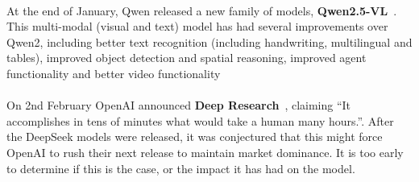 \paragraph{}At the end of January, Qwen released a new family of models, \textbf{Qwen2.5-VL}~\cite{Qwen2025}. This multi-modal (visual and text) model has had several improvements over Qwen2, including better text recognition (including handwriting, multilingual and tables), improved object detection and spatial reasoning, improved agent functionality and better video functionality

\paragraph{}On 2nd February OpenAI announced \textbf{Deep Research}~\cite{OpenAIDeepResearch2025}, claiming “It accomplishes in tens of minutes what would take a human many hours.”. After the DeepSeek models were released, it was conjectured that this might force OpenAI to rush their next release to maintain market dominance. It is too early to determine if this is the case, or the impact it has had on the model.
